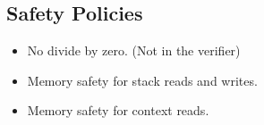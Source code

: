 \subsection{Safety Policies}
\label{subsec:safety_policies}

\begin{itemize}
\item No divide by zero. (Not in the verifier)
\item Memory safety for stack reads and writes.
\item Memory safety for context reads.

\end{itemize}

